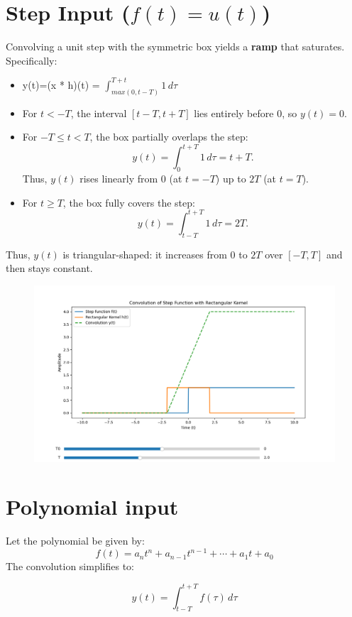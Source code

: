 \documentclass[12pt,a4paper]{report}
\begin{document}
\section{Step Input ($f(t) = u(t)$)}
Convolving a unit step with the symmetric box yields a \textbf{ramp} that saturates. Specifically:
\begin{itemize}
    \item y(t)=(x * h)(t) = $\int_{max(0,t -T)}^{T+t} 1 \, d\tau$\\
    \item For $t < -T$, the interval $[t-T, t+T]$ lies entirely before $0$, so $y(t) = 0$.
    \item For $-T \leq t < T$, the box partially overlaps the step:
    \[
    y(t) = \int_{0}^{t+T} 1\, d\tau = t + T.
    \]
    Thus, $y(t)$ rises linearly from $0$ (at $t = -T$) up to $2T$ (at $t = T$).
    \item For $t \geq T$, the box fully covers the step:
    \[
    y(t) = \int_{t-T}^{t+T} 1\, d\tau = 2T.
    \]
\end{itemize}
Thus, $y(t)$ is triangular-shaped: it increases from $0$ to $2T$ over $[-T,T]$ and then stays constant.
\begin{figure}[H]
   \centering
   \includegraphics[width=1\textwidth, height=0.5\textheight]{figs/step_con.png}
\end{figure}

\section{Polynomial input}

Let the polynomial be given by:
\[
f(t) = a_n t^n + a_{n-1} t^{n-1} + \cdots + a_1 t + a_0
\]
The convolution simplifies to:

\[
y(t) = \int_{t-T}^{t+T} f(\tau) \, d\tau
\]
\end{document}
